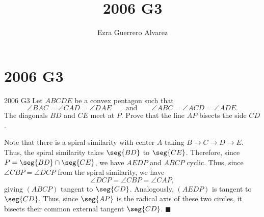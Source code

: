 \documentclass[14pt]{article}
\title{2006 G3}
\author{Ezra Guerrero Alvarez}
\begin{document}
\maketitle
	
\section*{2006 G3}

\begin{statement}{2006 G3}
	Let $ ABCDE$ be a convex pentagon such that
	\[
	\angle BAC = \angle CAD = \angle DAE\qquad \text{and}\qquad \angle ABC = \angle ACD = \angle ADE.
	\]
	The diagonals $BD$ and $CE$ meet at $P$.  Prove that the line $AP$ bisects the side $CD$.
\end{statement}
Note that there is a spiral similarity with center $A$ taking $B\rightarrow C\rightarrow D\rightarrow E$. Thus, the spiral similarity takes $\seg{BD}$ to $\seg{CE}$. Therefore, since $P=\seg{BD}\cap\seg{CE}$, we have $AEDP$ and $ABCP$ cyclic. Thus, since $\angle CBP = \angle DCP$ from the spiral similarity, we have
\[ \angle DCP = \angle CBP = \angle CAP, \]
giving $(ABCP)$ tangent to $\seg{CD}$. Analogously, $(AEDP)$ is tangent to $\seg{CD}$. Thus, since $\seg{AP}$ is the radical axis of these two circles, it bisects their common external tangent $\seg{CD}$. $\blacksquare$
	
\end{document}
